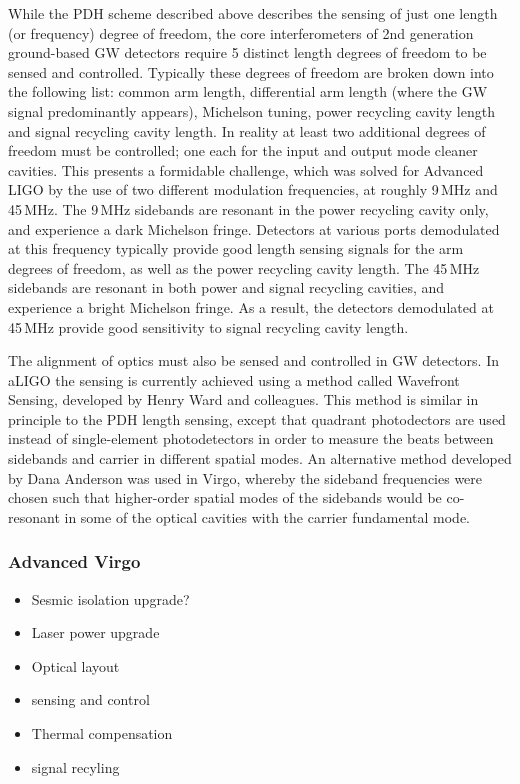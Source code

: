 While the PDH scheme described above describes the sensing of just one length (or frequency) degree of freedom, 
the core interferometers of 2nd generation ground-based GW detectors require 5 distinct length degrees of freedom to 
be sensed and controlled. Typically these degrees of freedom are broken down into the following list: common arm length, 
differential arm length (where the GW signal predominantly appears), Michelson tuning, power recycling cavity length and 
signal recycling cavity length. In reality at least two additional degrees of freedom must be controlled; one each for the input 
and output mode cleaner cavities. This presents a formidable challenge, which was solved for Advanced LIGO by the use of two 
different modulation frequencies, at roughly 9\,MHz and 45\,MHz. The 9\,MHz sidebands are resonant in the power recycling 
cavity only, and experience a dark Michelson fringe. Detectors at various ports demodulated at this frequency typically provide 
good length sensing signals for the arm degrees of freedom, as well as the power recycling cavity length. The 45\,MHz sidebands 
are resonant in both power and signal recycling cavities, and experience a bright Michelson fringe. As a result, the detectors demodulated 
at 45\,MHz provide good sensitivity to signal recycling cavity length.

The alignment of optics must also be sensed and controlled in GW detectors. In aLIGO the sensing is currently achieved using a method 
called Wavefront Sensing, developed by Henry Ward and colleagues. This method is similar in principle to the PDH length sensing, 
except that quadrant photodectors are used 
instead of single-element photodetectors in order to measure the beats between sidebands and carrier in different spatial modes. An 
alternative method developed by Dana Anderson was used in Virgo, whereby the sideband frequencies were chosen such that higher-order 
spatial modes of the sidebands would be co-resonant in some of the optical cavities with the carrier fundamental mode. 

\subsubsection{Advanced Virgo}
\begin{itemize}
\item Sesmic isolation upgrade?
\item Laser power upgrade
\item Optical layout
\item sensing and control
\item Thermal compensation
\item signal recyling
\end{itemize}